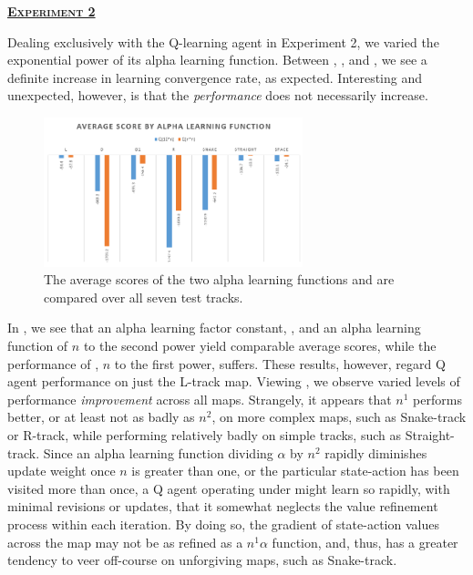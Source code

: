\documentclass[12pt, letter]{article}
\newlength{\remaining}
\newcommand{\titleline}[1]{%
\setlength{\remaining}{\textwidth-\widthof{\textsc{#1}}}
\noindent\underline{\textsc{\textbf{#1}}\hspace*{\remaining}}\par}
\begin{document}
\titleline{Experiment 2}

Dealing exclusively with the Q-learning agent in Experiment 2, we varied the exponential power of its alpha learning function.  Between , , and , we see a definite increase in learning convergence rate, as expected.  Interesting and unexpected, however, is that the \emph{performance} does not necessarily increase.

\begin{figure} 
  \includegraphics[width=0.67\textwidth]{img/alpha_AvgScore}
  \caption{The average scores of the two alpha learning functions  and  are compared over all seven test tracks.}
  \label{fig:mapsAvgScoreMaps}
  \vspace{-.5em}
\end{figure}

In , we see that an alpha learning factor constant, , and an alpha learning function of $n$ to the second power yield comparable average scores, while the performance of , $n$ to the first power, suffers.  These results, however, regard Q agent performance on just the L-track map.  Viewing , we observe varied levels of performance \emph{improvement} across all maps.  Strangely, it appears that $n^1$ performs better, or at least not as badly as $n^2$, on more complex maps, such as Snake-track or R-track, while performing relatively badly on simple tracks, such as Straight-track.  Since an alpha learning function dividing $\alpha$ by $n^2$ rapidly diminishes update weight once $n$ is greater than one, or the particular state-action has been visited more than once, a Q agent operating under  might learn so rapidly, with minimal revisions or updates, that it somewhat neglects the value refinement process within each iteration.  By doing so, the gradient of state-action values across the map may not be as refined as a $n^1 \alpha$ function, and, thus, has a greater tendency to veer off-course on unforgiving maps, such as Snake-track.
\end{document}
